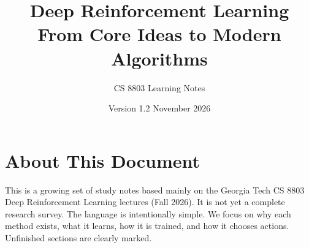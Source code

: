 \documentclass[11pt,a4paper]{book}
\title{Deep Reinforcement Learning\\\large From Core Ideas to Modern Algorithms}
\author{CS 8803 Learning Notes}
\date{Version 1.2 \quad November 2026}
\begin{document}
\frontmatter\maketitle
\chapter*{About This Document}
This is a growing set of study notes based mainly on the Georgia Tech CS 8803 Deep Reinforcement Learning lectures (Fall 2026). It is not yet a complete research survey. The language is intentionally simple. We focus on why each method exists, what it learns, how it is trained, and how it chooses actions. Unfinished sections are clearly marked.
\tableofcontents
\mainmatter













\appendix
\end{document}
